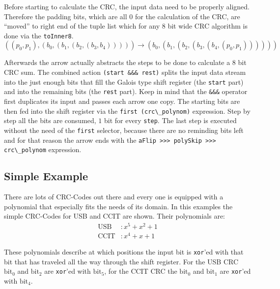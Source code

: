 \documentclass[9pt,final,a4paper,leqno]{article}
\newcommand{\hs}[1]{\mbox{\lstinline[basicstyle=\color{textgray}]!#1!}}
\begin{document}
Before starting to calculate the CRC, the input data need to be properly aligned. Therefore the padding bits, which are all $0$ for the
calculation of the CRC, are ``moved'' to right end of the tuple list which for any 8 bit wide CRC algorithm is done via the \hs{toInner8}.
\[((p_0, p_1), (b_0, (b_1, (b_2, (b_3, b_4))))) \rightarrow (b_0, (b_1, (b_2, (b_3, (b_4, (p_0, p_1))))))\]

\par
Afterwards the arrow actually abstracts the steps to be done to calculate a 8 bit CRC sum. The combined action \hs{(start &&& rest)} splits
the input data stream into the just enough bits that fill the Galois type shift register (the \hs{start} part) and into the remaining bits
(the \hs{rest} part). Keep in mind that the \hs{&&&} operator first duplicates its input and passes each arrow one copy. The starting bits
are then fed into the shift register via the \hs{first (crc\_polynom)} expression. Step by step all the bits are consumed, $1$ bit for every
\hs{step}. The last step is executed without the need of the \hs{first} selector, because there are no reminding bits left and for that
reason the arrow ends with the \hs{aFlip >>> polySkip >>> crc\_polynom} expression. 


\subsection{Simple Example}
There are lots of CRC-Codes out there and every one is equipped with a polynomial that especially fits the needs of its domain. In this
examples the simple CRC-Codes for USB and CCIT are shown. Their polynomials are:
\begin{align*}
  \text{USB} &: x^5 + x^2 + 1 \\
  \text{CCIT}&: x^4 + x   + 1 
\end{align*}

These polynomials describe at which positions the input bit is \hs{xor}'ed with that bit that has traveled all the way through the shift
register. For the USB CRC $\text{bit}_0$ and $\text{bit}_2$ are \hs{xor}'ed with $\text{bit}_5$, for the CCIT CRC the $\text{bit}_0$ and
$\text{bit}_1$ are \hs{xor}'ed with $\text{bit}_4$. 

\begin{figure}
  \centering
  \graphicspath{{./}{Images/}}
  \mbox{%
     \quad \quad \quad \quad
  }
\end{figure}
\end{document}
